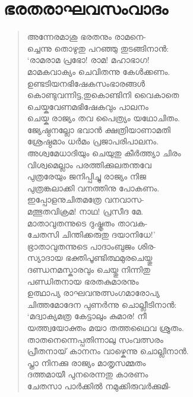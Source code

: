 
\section{ഭരതരാഘവസംവാദം}

\begin{verse}
അന്നേരമാശു ഭരതനും രാമനെ-\\
ച്ചെന്നു തൊഴുതു പറഞ്ഞു തുടങ്ങിനാന്‍:\\
‘രാമരാമ പ്രഭോ! രാമ! മഹാഭാഗ!\\
മാമകവാക്യം ചെവിതന്നു കേള്‍ക്കണം.\\
ഉണ്ടടിയനഭിഷേകസംഭാരങ്ങള്‍\\
കൊണ്ടുവന്നിട്ട,തുകൊണ്ടിനി വൈകാതെ\\
ചെയ്കവേണമഭിഷേകവും പാലനം\\
ചെയ്ക രാജ്യം തവ പൈത്ര്യം യഥോചിതം.\\
ജ്യേഷ്ഠനല്ലോ ഭവാന്‍ ക്ഷത്രിയാണാമതി\\
ശ്രേഷ്ഠമാം ധര്‍മം പ്രജാപരിപാലനം.\\
അശ്വമേധാദിയും ചെയുതു കീര്‍ത്ത്യാ ചിരം\\
വിശ്വമെല്ലാം പരത്തിക്കുലതന്തവേ\\
പുത്രരേയും ജനിപ്പിച്ചു രാജ്യം നിജ\\
പുത്രങ്കലാക്കി വനത്തിനു പോകണം.\\
ഇപ്പോളനുചിതമത്രേ വനവാസ-\\
മത്ഭുതവിക്രമ! നാഥ! പ്രസീദ മേ.\\
മാതാവുതന്നുടെ ദുഷ്കൃതം താവക-\\
ചേതസി ചിന്തിക്കരുതു ദയാനിധേ!’\\
ഭ്രാതാവുതന്നുടെ പാദാംബുജം ശിര-\\
സ്യാദായ ഭക്തിപൂണ്ടിത്ഥമുരചെയ്തു\\
ദണ്ഡനമസ്കാരവും ചെയ്തു നിന്നിതു\\
പണ്ഡിതനായ ഭരതകുമാരനും\\
ഉത്ഥാപ്യ രാഘവനുത്സംഗമാരോപ്യ\\
ചിത്തമോദേന പുണര്‍ന്നു ചൊല്ലീടിനാന്‍:\\
‘മദ്വാക്യമത്ര കേട്ടാലും കുമാര! നീ\\
യത്ത്വയോക്തം മയാ തത്തഥൈവ ശ്രുതം.\\
താതനെന്നെപ്പതിന്നാലു സംവത്സരം\\
പ്രീതനായ് കാനനം വാഴ്കെന്നു ചൊല്ലിനാന്‍.\\
പ്ത്രാ നിനക്കു രാജ്യം മാതൃസമ്മതം\\
ദത്തമായീ പുനരെന്നതു കാരണം\\
ചേതസാ പാര്‍ക്കില്‍ നമുക്കിരുവര്‍ക്കുമി-\\

\end{verse}
